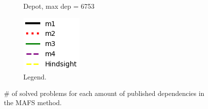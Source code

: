 \documentclass{article}
\newcommand{\commentout}[1]{}
\theoremstyle{remark}
\begin{document}
\begin{figure}[t!]
\begin{subfigure}[b]{0.25\textwidth}
  \caption{Depot, max dep = 6753}
  \label{fig:DepotMAFS}
\end{subfigure}\hspace{1em}
\begin{subfigure}[b]{0.1\textwidth}
\centering
  \includegraphics[scale=0.5]{Results_graphs/coverage_legend_without_random}
  \caption{Legend.}
  \label{fig:LegendMAFS}
\end{subfigure}\hspace{1em}
\caption{\# of solved problems for each amount of published dependencies in the MAFS method.
\commentout{Graphs truncated after all methods solve all problems.}}
\label{fig:CoverageMAFS}
\end{figure}
\end{document}
